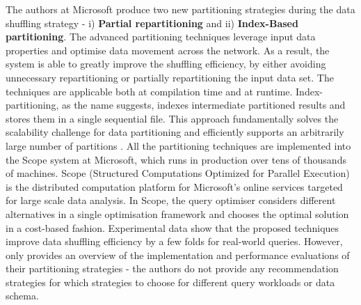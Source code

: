 The authors at Microsoft produce two new partitioning strategies during the data shuffling strategy - i) \textbf{Partial repartitioning} and ii) \textbf{Index-Based partitioning}. The advanced partitioning techniques leverage input data properties and optimise data movement across the network. As a result, the system is able to greatly improve the shuffling efficiency, by either avoiding unnecessary repartitioning or partially repartitioning the input data set. The techniques are applicable both at compilation time and at runtime. Index-partitioning, as the name suggests, indexes intermediate partitioned results and stores them in a single sequential file. This approach fundamentally solves the scalability challenge for data partitioning and efficiently supports an arbitrarily large number of partitions \cite{DBLP:conf/sigmod/ZhouBL12}. 
All the partitioning techniques are implemented into the Scope system at Microsoft, which runs in production over tens of thousands of machines. Scope \cite{chaiken2008scope, zhou2010incorporating} (Structured Computations Optimized for Parallel Execution) is the distributed computation platform for Microsoft’s online services targeted for large scale data analysis. In Scope, the query optimiser considers different alternatives in a single optimisation framework and chooses the optimal solution in a cost-based fashion. Experimental data show that the proposed techniques improve data shuffling efficiency by a few folds for real-world queries. However, \cite{DBLP:conf/sigmod/ZhouBL12} only provides an overview of the implementation and performance evaluations of their partitioning strategies - the authors do not provide any recommendation strategies for which strategies to choose for different query workloads or data schema. 


